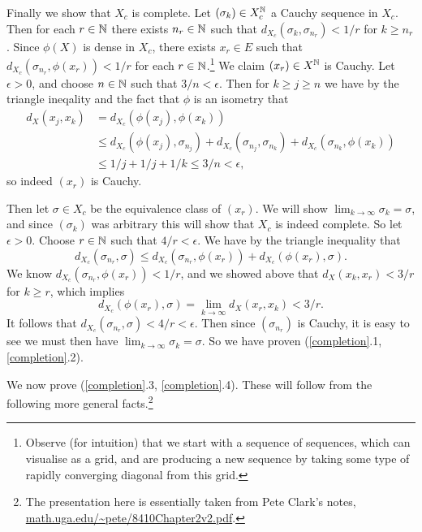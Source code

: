 \begin{nothing}
  Finally we show that $X_c$ is complete. Let $(\sigma_k) \in
  X_c^{\mathbb{N}}$ a Cauchy sequence in $X_c$. Then for each $r \in \mathbb{N}$ there
  exists $n_r \in \mathbb{N}$ such that $d_{X_c} (\sigma_k, \sigma_{n_r}) <
  1/r$ for $k \ge n_r$. Since $\phi(X)$ is dense in $X_c$, there
  exists $x_r \in E$ such that $d_{X_c}(\sigma_{n_r}, \phi(x_r)) <
  1/r$ for each $r \in \mathbb{N}$.\footnote{Observe (for intuition) that we
    start with a sequence of sequences, which can visualise as a grid,
    and are producing a new sequence by taking some type of rapidly
    converging diagonal from this grid.} We claim $(x_r) \in X^{\mathbb{N}}$ is
  Cauchy. Let $\epsilon > 0$, and choose $n \in \mathbb{N}$ such that $3/n <
  \epsilon$. Then for $k \ge j \ge n$ we have by the triangle
  ineqality and the fact that $\phi$ is an isometry that
  \begin{align*}
    d_X(x_j,x_k) &= d_{X_c}(\phi(x_j),\phi(x_k)) \\ &\le
    d_{X_c}(\phi(x_j), \sigma_{n_j}) + d_{X_c}(\sigma_{n_j},
    \sigma_{n_k}) + d_{X_c}(\sigma_{n_k}, \phi(x_k)) \\ &\le 1/j + 1/j
    + 1/k \le 3/n < \epsilon,
  \end{align*}
  so indeed $(x_r)$ is Cauchy.

  Then let $\sigma \in X_c$ be the equivalence class of $(x_r)$. We
  will show $\lim_{k \to \infty} \sigma_k = \sigma$, and since
  $(\sigma_k)$ was arbitrary this will show that $X_c$ is indeed
  complete. So let $\epsilon > 0$. Choose $r \in \mathbb{N}$ such that $4/r <
  \epsilon$. We have by the triangle inequality that
  \[
  d_{X_c}(\sigma_{n_r}, \sigma) \le d_{X_c}(\sigma_{n_r}, \phi(x_r)) +
  d_{X_c}(\phi(x_r), \sigma).
  \]
  We know $d_{X_c}(\sigma_{n_r}, \phi(x_r)) < 1/r$, and we showed
  above that $d_X(x_k,x_r) < 3/r$ for $k \ge r$, which implies
  \[
  d_{X_c}(\phi(x_r), \sigma) = \lim_{k \to \infty} d_X(x_r,x_k) < 3/r.
  \]
  It follows that $d_{X_c}(\sigma_{n_r}, \sigma) < 4/r <
  \epsilon$. Then since $(\sigma_{n_r})$ is Cauchy, it is easy to see
  we must then have $\lim_{k \to \infty} \sigma_k = \sigma$. So we
  have proven (\ref{completion}.1, \ref{completion}.2).
\end{nothing}

We now prove (\ref{completion}.3, \ref{completion}.4). These will
follow from the following more general facts.\footnote{The
  presentation here is essentially taken from Pete Clark's notes,
  \url{math.uga.edu/~pete/8410Chapter2v2.pdf}.}

